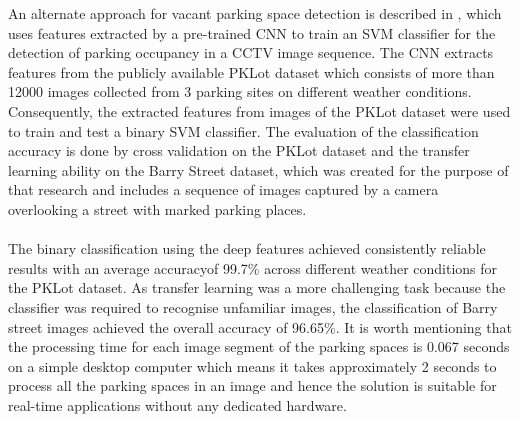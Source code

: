\documentclass[12pt]{article}
\begin{document}
An alternate approach for vacant parking space detection is described in \cite{debaditya}, which uses features extracted by a pre-trained CNN to train an SVM classifier for the detection of parking occupancy in a CCTV image sequence.
The CNN extracts features from the publicly available PKLot dataset which consists of more than 12000 images collected from 3 parking sites on different weather conditions. 
Consequently, the extracted features from images of the PKLot dataset were used to train and test a binary SVM classifier.
The evaluation of the classification accuracy is done by cross validation on the PKLot dataset and the transfer learning ability on the Barry Street dataset, which was created for the purpose of that research and includes a sequence of images captured by a camera overlooking a street with marked parking places.\\\\
The binary classification using the deep features achieved consistently reliable results with an average accuracyof 99.7\% across different weather conditions for the PKLot dataset.
As transfer learning was a more challenging task because the classifier was required to recognise unfamiliar images, the classification of Barry street images achieved the overall accuracy of 96.65\%.
It is worth mentioning that the processing time for each image segment of the parking spaces is 0.067 seconds on a simple desktop computer which means it takes approximately 2 seconds to process all the parking spaces in an image and hence the solution is suitable for real-time applications without any dedicated hardware.



\end{document}
